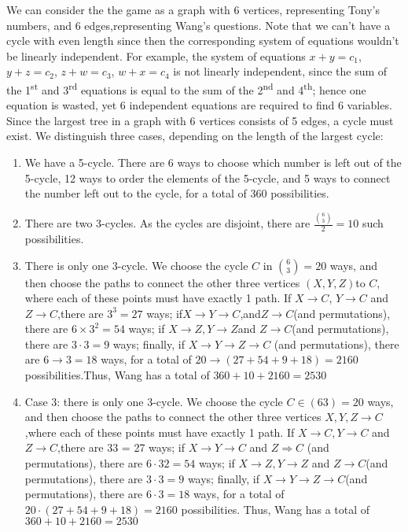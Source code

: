 \begin{solution}
    We can consider the the game as a graph with 6 vertices, representing Tony’s numbers, and 6 edges,representing Wang’s questions.  Note that we can’t have a cycle with even length since then the corresponding system of equations wouldn’t be linearly independent.  For example, the system of equations $x+y=c_1$, $y+z=c_2$, $z+w=c_3$, $w+x=c_4$ is not linearly independent, since the sum of the 1\textsuperscript{st} and 3\textsuperscript{rd} equations is equal to the sum of the 2\textsuperscript{nd} and 4\textsuperscript{th}; hence one equation is wasted, yet 6 independent equations are required to find 6 variables. Since the largest tree in a graph with 6 vertices consists of 5 edges, a cycle must exist.  We distinguish three cases, depending on the length of the largest cycle:
    \begin{enumerate}
    \item We have a 5-cycle.  There are 6 ways to choose which number is left out of the 5-cycle, 12 ways to order the elements of the 5-cycle, and 5 ways to connect the number left out to the cycle, for a total of 360 possibilities.
    \item There are two 3-cycles.  As the cycles are disjoint, there are \(\frac{\binom{6}{3}}{2}= 10\) such possibilities.
    \item There is only one 3-cycle.  We choose the cycle $C$ in \(\binom{6}{3}= 20\) ways, and then choose the paths to connect the other three vertices $(X, Y, Z)$to $C$, where each of these points must have exactly 1 path.  If $X \rightarrow C$, $Y \rightarrow C$ and $Z \rightarrow C$,there are $3^3= 27$ ways; if$X \rightarrow Y \rightarrow C$,and$Z \rightarrow C$(and permutations), there are $6 \times 3^2= 54$ ways; if $X \rightarrow Z, Y \rightarrow Z$and \(Z\rightarrow C\)(and permutations), there are \(3\cdot3 = 9\) ways; finally, if \(X\rightarrow Y\rightarrow Z\rightarrow C\) (and permutations), there are \(6\rightarrow3 = 18\) ways, for a total of \(20\rightarrow(27 + 54 + 9 + 18) = 2160\) possibilities.Thus, Wang has a total of \(360 + 10 + 2160 = 2530\)
    \item Case 3: there is only one 3-cycle.  We choose the cycle \(C\in(63)= 20\) ways, and then choose the paths to connect the other three vertices \(X, Y, Z\rightarrow C\),where each of these points must have exactly 1 path. If \(X→C, Y\rightarrow C\) and \(Z\rightarrow C\),there are 33 = 27 ways; if \(X\rightarrow Y\rightarrow C\) and \(Z\Rightarrow C\) (and permutations), there are \(6\cdot32= 54\) ways; if \(X\rightarrow Z, Y\rightarrow Z\) and \(Z\rightarrow C\)(and permutations), there are \(3\cdot3 = 9\) ways; finally, if \(X\rightarrow Y\rightarrow Z\rightarrow C\)(and permutations), there are \(6\cdot3 = 18\) ways, for a total of \(20\cdot(27 + 54 + 9 + 18) = 2160\) possibilities. Thus, Wang has a total of \(360 + 10 + 2160 =2530\)
    \end{enumerate}

\end{solution}\bigskip
